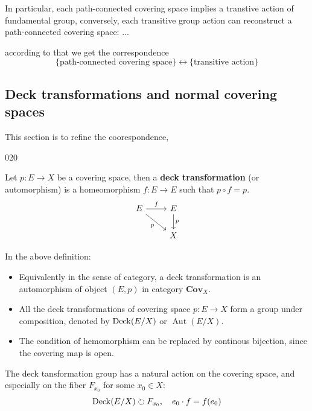 \documentclass[12pt,a4paper]{article}
\begin{document}
In particular, each path-connected covering space implies a transtive action of fundamental group, conversely, each transitive group action can reconstruct a path-connected covering space:
...

according to that we get the correspondence
\[\{\text{path-connected covering space}\} \longleftrightarrow  \{\text{transitive action}\}\]



\subsection{Deck transformations and normal covering spaces}

This section is to refine the coorespondence, 

020

\begin{definition}
    Let \(p:E \to X\) be a covering space, then a \textbf{deck transformation} (or automorphism) is a homeomorphism \(f:E \to E\) such that \(p \circ f = p\).
\[\begin{tikzcd}
	E & E \\
	& X
	\arrow["f", from=1-1, to=1-2]
	\arrow["p"', from=1-1, to=2-2]
	\arrow["p", from=1-2, to=2-2]
\end{tikzcd}\]
\end{definition}

In the above definition:
\begin{itemize}
    \item Equivalently in the sense of category, a deck transformation is an automorphism of object \((E,p)\) in category \(\mathbf{Cov}_X\).

    \item All the deck transformations of covering space \(p:E \to X\) form a group under composition, denoted by \(\operatorname{Deck}(E/X)\) or \(\operatorname{Aut}(E/X)\).

    \item The condition of hemomorphism can be replaced by continous bijection, since the covering map is open.
\end{itemize}

The deck tansformation group has a natural action on the covering space, and especially on the fiber \(F_{x_0}\) for some \(x_0 \in X\):
\[\operatorname{Deck}(E/X) \circlearrowright F_{x_0}, \quad e_0\cdot f = f(e_0) \]
\end{document}
